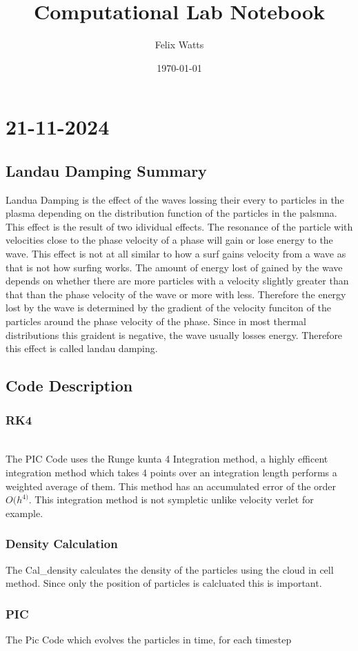 \documentclass[a4paper]{article}
\begin{document}
\title{Computational Lab Notebook}
\author{Felix Watts}
\date{\today}
\maketitle
\section{21-11-2024}
\subsection{Landau Damping Summary}
Landua Damping is the effect of the waves lossing their every to particles in the plasma depending on the distribution function of the particles in the palsmna. This effect is the result of two idividual effects. The resonance of the particle with velocities close to the phase velocity of a phase will gain or lose energy to the wave. This effect is not at all similar to how a surf gains velocity from a wave as that is not how surfing works. The amount of energy lost of gained by the wave depends on whether there are more particles with a velocity slightly greater than that than the phase velocity of the wave or more with less. Therefore the energy lost by the wave is determined by the gradient of the velocity funciton of the particles around the phase velocity of the phase. Since in most thermal distributions this graident is negative, the wave usually losses energy. Therefore this effect is called landau damping.
\subsection{Code Description}
\subsubsection{RK4}\\
The PIC Code uses the Runge kunta 4 Integration method, a highly efficent integration method which takes 4 points over an integration length performs a weighted average of them. This method has an accumulated error of the order $O(h^{4)}$. This integration method is not sympletic unlike velocity verlet for example. 
\subsubsection{Density Calculation}
The Cal_density calculates the density of the particles using the cloud in cell method. Since only the position of particles is calcluated this is important. 
\subsubsection{PIC}
The Pic Code which evolves the particles in time, for each timestep 
\end{document}
